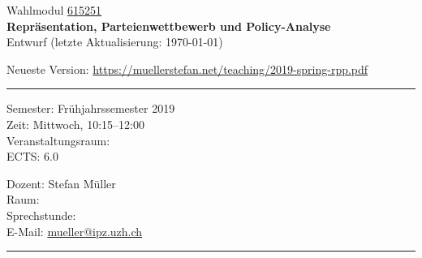 \documentclass[abstract=on,parskip=full,headings=standardclasses,fontsize=11pt,paper=a4]{scrartcl}
\begin{document}
	
\singlespacing

\noindent
{}%
\hfill%

\singlespacing
\vspace{1cm}

\begin{center}
{\large Wahlmodul \href{https://studentservices.uzh.ch/uzh/anonym/vvz/index.html#/details/2018/004/E/50926420}{615251}} \\ 
\medskip
{\Large \textbf{Repräsentation, Parteienwettbewerb und Policy-Analyse}} \\
\bigskip
{\large  Entwurf (letzte Aktualisierung: \today)}

Neueste Version: \url{https://muellerstefan.net/teaching/2019-spring-rpp.pdf}
\end{center}

\vspace{1.5cm}

\hrule
\medskip
\begin{minipage}[t]{0.5\textwidth}
Semester: Frühjahrssemester 2019 \\
Zeit: Mittwoch, 10:15--12:00 \\
Veranstaltungsraum: \\
ECTS: 6.0
\end{minipage}
\begin{minipage}[t]{0.5\textwidth}
\begin{flushright}
Dozent: Stefan Müller \\
Raum: \\
Sprechstunde: \\
E-Mail: \textsf{\href{mailto:mueller@ipz.uzh.ch}{mueller@ipz.uzh.ch}}
\end{flushright}
\end{minipage}
\medskip
\vspace{2.5mm}
\hrule 
\end{document}
